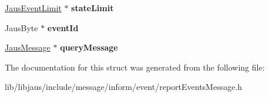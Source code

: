 \begin{DoxyCompactItemize}
\item 
\hypertarget{struct_report_events_message_struct_a92a34d92d3449045e8d817778542e9f0}{\hyperlink{struct_jaus_event_limit_struct}{\-Jaus\-Event\-Limit} $\ast$ {\bfseries state\-Limit}}\label{struct_report_events_message_struct_a92a34d92d3449045e8d817778542e9f0}

\item 
\hypertarget{struct_report_events_message_struct_a2f25aafad0f79c4a9d0c613706efcff6}{\-Jaus\-Byte $\ast$ {\bfseries event\-Id}}\label{struct_report_events_message_struct_a2f25aafad0f79c4a9d0c613706efcff6}

\item 
\hypertarget{struct_report_events_message_struct_a4ca458ef54cc84e5fbf8086e7f01e8de}{\hyperlink{struct_jaus_message_struct}{\-Jaus\-Message} $\ast$ {\bfseries query\-Message}}\label{struct_report_events_message_struct_a4ca458ef54cc84e5fbf8086e7f01e8de}

\end{DoxyCompactItemize}


\-The documentation for this struct was generated from the following file\-:\begin{DoxyCompactItemize}
\item 
lib/libjaus/include/message/inform/event/report\-Events\-Message.\-h\end{DoxyCompactItemize}
